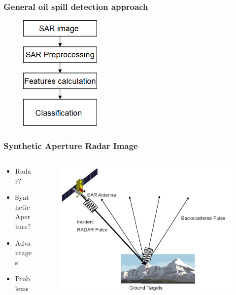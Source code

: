 \documentclass{beamer}
\begin{document}
\begin{frame}
\frametitle{General oil spill detection approach}

	\begin{figure}
		\centering
    	\includegraphics[width=40mm,scale=1]{./img/basicsteps.png}
	\end{figure}

\end{frame}


\begin{frame}
\frametitle{Synthetic Aperture Radar Image}

	\begin{columns}[T]
    	\begin{column}{.4\textwidth}

			\begin{itemize}
				\item Radar?
				\item Synthetic Aperture?
				\item Advantages
				\item Problems

			\end{itemize}
		\end{column}
		\begin{column}{.6\textwidth}
			\begin{figure}
				\centering
   				\includegraphics[width=\textwidth]{./img/SARexplained.png}
			\end{figure}
		\end{column}
	\end{columns}

\end{frame}
\end{document}
